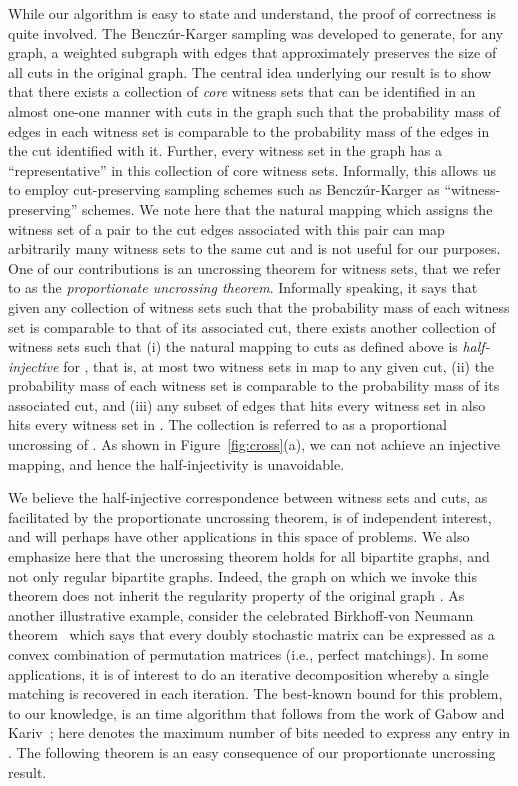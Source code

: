 \documentclass[11pt]{article}
\begin{document}
While our algorithm is easy to state and understand, the proof of correctness
is quite involved. The Bencz\'{u}r-Karger sampling was developed to generate, for
any graph, a weighted subgraph with  edges that approximately
preserves the size of all cuts in the original graph. The central idea
underlying our result is to show that there exists a collection of {\em core}
witness sets that can be identified in an almost one-one manner with cuts in
the graph such that the probability mass of edges in each witness set is
comparable to the probability mass of the edges in the cut identified with
it. Further, every witness set in the graph has a ``representative'' in this
collection of core witness sets. Informally, this allows us to employ
cut-preserving sampling schemes such as Bencz\'{u}r-Karger as
``witness-preserving'' schemes. We note here that the natural mapping which
assigns the witness set of a pair  to the cut edges associated with
this pair can map arbitrarily many witness sets to the same cut and is not
useful for our purposes. One of our contributions is an uncrossing
theorem for witness sets, that we refer to as the {\em proportionate
  uncrossing theorem}.  Informally speaking, it says that given any collection
of witness sets  such that the probability mass of each witness set is
comparable to that of its associated cut, there exists another collection
 of witness sets such that (i) the natural mapping to cuts as
defined above is {\em half-injective} for , that is, at most two
witness sets in  map to any given cut, (ii) the probability mass of
each witness set is comparable to the probability mass of its associated cut,
and (iii) any subset of edges that hits every witness set in  also
hits every witness set in .  The collection  is referred to
as a proportional uncrossing of . As shown in
Figure~\ref{fig:cross}(a), we can not achieve an injective mapping, and hence
the half-injectivity is unavoidable.

We believe the half-injective correspondence between witness sets and cuts, as
facilitated by the proportionate uncrossing theorem, is of independent
interest, and will perhaps have other applications in this space of
problems. We also emphasize here that the uncrossing theorem holds for all
bipartite graphs, and not only regular bipartite graphs. Indeed, the graph
 on which we invoke this theorem does not inherit the regularity property
of the original graph .  As another illustrative example, consider the
celebrated Birkhoff-von Neumann theorem~\cite{b:graphtheory,vn:bvn53} which
says that every doubly stochastic matrix can be expressed as a convex
combination of permutation matrices (i.e., perfect matchings).  In some
applications, it is of interest to do an iterative decomposition whereby a
single matching is recovered in each iteration. The best-known bound for this
problem, to our knowledge, is an  time algorithm that follows from the
work of Gabow and Kariv~\cite{gk:edge1982}; here  denotes the maximum
number of bits needed to express any entry in . The following theorem is an
easy consequence of our proportionate uncrossing result.
\end{document}
